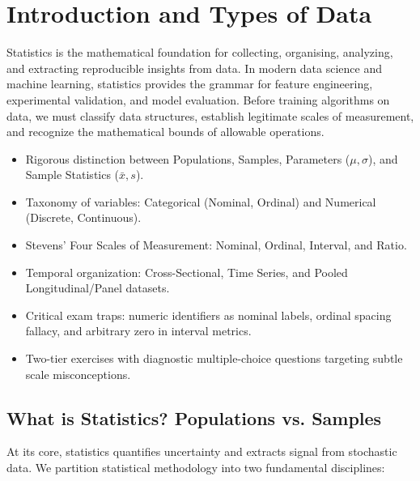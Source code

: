 \chapter{Introduction and Types of Data}

Statistics is the mathematical foundation for collecting, organising, analyzing, and extracting reproducible insights from data. In modern data science and machine learning, statistics provides the grammar for feature engineering, experimental validation, and model evaluation. Before training algorithms on data, we must classify data structures, establish legitimate scales of measurement, and recognize the mathematical bounds of allowable operations.

\vspace{0.5cm}
\begin{tcolorbox}[colback=primarylight, colframe=primarydark, title={\textbf{What You'll Learn in this Chapter}}]
\begin{itemize}
    \item Rigorous distinction between Populations, Samples, Parameters ($\mu, \sigma$), and Sample Statistics ($\bar{x}, s$).
    \item Taxonomy of variables: Categorical (Nominal, Ordinal) and Numerical (Discrete, Continuous).
    \item Stevens' Four Scales of Measurement: Nominal, Ordinal, Interval, and Ratio.
    \item Temporal organization: Cross-Sectional, Time Series, and Pooled Longitudinal/Panel datasets.
    \item Critical exam traps: numeric identifiers as nominal labels, ordinal spacing fallacy, and arbitrary zero in interval metrics.
    \item Two-tier exercises with diagnostic multiple-choice questions targeting subtle scale misconceptions.
\end{itemize}
\end{tcolorbox}

\section{What is Statistics? Populations vs. Samples}

At its core, statistics quantifies uncertainty and extracts signal from stochastic data. We partition statistical methodology into two fundamental disciplines:

